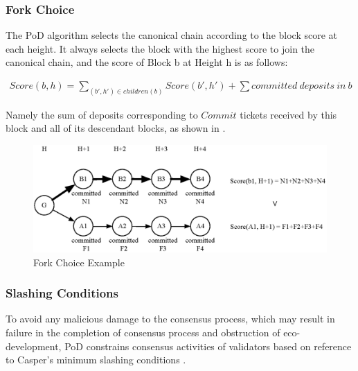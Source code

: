 \subsubsection{Fork Choice}
\label{pod:design:fork}

The PoD algorithm selects the canonical chain according to the block score at each height. It always selects the block with the highest score to join the canonical chain, and the score of Block b at Height h is as follows:


\begin{align}
Score(b, h) = \sum_{(b',h') \in children(b)}Score(b', h') + \sum committed~deposits~in~b
\end{align}
\noindent

Namely the sum of deposits corresponding to $Commit$ tickets received by this block and all of its descendant blocks, as shown in .


\begin{figure}[h]
\centering
\includegraphics[width=12cm]{./figs/fork}
\caption{Fork Choice Example}
\label{fig:fork_choice}
\end{figure}

\subsubsection{Slashing Conditions}
\label{pod:design:vote}

To avoid any malicious damage to the consensus process, which may result in failure in the completion of consensus process and obstruction of eco-development, PoD constrains consensus activities of validators based on reference to Casper’s minimum slashing conditions \cite{minimal_slash_rules}.


